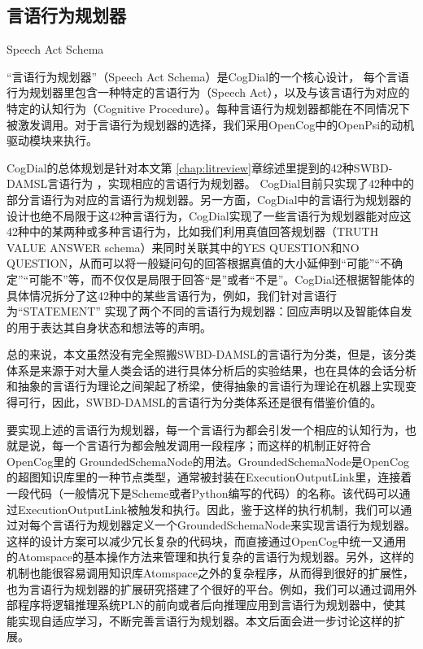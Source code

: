 \subsection {言语行为规划器}{Speech Act Schema}
\label{sec:SAS}

“言语行为规划器”（Speech Act Schema）是CogDial的一个核心设计， 每个言语行为规划器里包含一种特定的言语行为（Speech Act），以及与该言语行为对应的特定的认知行为（Cognitive Procedure）。每种言语行为规划器都能在不同情况下被激发调用。对于言语行为规划器的选择，我们采用OpenCog中的OpenPsi的动机驱动模块来执行。

    CogDial的总体规划是针对本文第 \ref{chap:litreview}章综述里提到的42种SWBD-DAMSL言语行为 \cite{Twitchell2004}，实现相应的言语行为规划器。 CogDial目前只实现了42种中的部分言语行为对应的言语行为规划器。另一方面，CogDial中的言语行为规划器的设计也绝不局限于这42种言语行为，CogDial实现了一些言语行为规划器能对应这42种中的某两种或多种言语行为，比如我们利用真值回答规划器（TRUTH VALUE ANSWER schema）来同时关联其中的YES QUESTION和NO QUESTION，从而可以将一般疑问句的回答根据真值的大小延伸到“可能”“不确定”“可能不”等，而不仅仅是局限于回答“是”或者“不是”。CogDial还根据智能体的具体情况拆分了这42种中的某些言语行为，例如，我们针对言语行为“STATEMENT” 实现了两个不同的言语行为规划器：回应声明以及智能体自发的用于表达其自身状态和想法等的声明。

总的来说，本文虽然没有完全照搬SWBD-DAMSL的言语行为分类，但是，该分类体系是来源于对大量人类会话的进行具体分析后的实验结果，也在具体的会话分析和抽象的言语行为理论之间架起了桥梁，使得抽象的言语行为理论在机器上实现变得可行，因此，SWBD-DAMSL的言语行为分类体系还是很有借鉴价值的。

要实现上述的言语行为规划器，每一个言语行为都会引发一个相应的认知行为，也就是说，每一个言语行为都会触发调用一段程序；而这样的机制正好符合OpenCog里的 GroundedSchemaNode的用法。GroundedSchemaNode是OpenCog的超图知识库里的一种节点类型，通常被封装在ExecutionOutputLink里，连接着一段代码（一般情况下是Scheme或者Python编写的代码）的名称。该代码可以通过ExecutionOutputLink被触发和执行。因此，鉴于这样的执行机制，我们可以通过对每个言语行为规划器定义一个GroundedSchemaNode来实现言语行为规划器。这样的设计方案可以减少冗长复杂的代码块，而直接通过OpenCog中统一又通用的Atomspace的基本操作方法来管理和执行复杂的言语行为规划器。另外，这样的机制也能很容易调用知识库Atomspace之外的复杂程序，从而得到很好的扩展性，也为言语行为规划器的扩展研究搭建了个很好的平台。例如，我们可以通过调用外部程序将逻辑推理系统PLN的前向或者后向推理应用到言语行为规划器中，使其能实现自适应学习，不断完善言语行为规划器。本文后面会进一步讨论这样的扩展。

